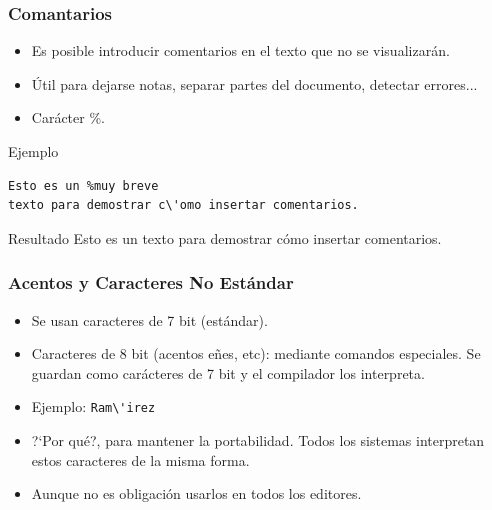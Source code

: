 \documentclass[aspectratio=43]{beamer}%
\begin{document}
\begin{frame}[fragile]
\frametitle{\textbf{Comantarios}}
\justifying
 \begin{itemize}\justifying
  \item Es posible introducir comentarios en el texto que no se visualizarán.
  \item Útil para dejarse notas, separar partes del documento, detectar errores...
  \item Carácter \%.
\end{itemize}

\begin{exampleblock}{Ejemplo}
   \vspace{-0.7cm}
\begin{lstlisting}
Esto es un %muy breve
texto para demostrar c\'omo insertar comentarios.
\end{lstlisting}\vspace{-0.3cm}

\end{exampleblock}

\begin{exampleblock}{Resultado}
Esto es un %
texto para demostrar c\'omo insertar comentarios.
\end{exampleblock}


\end{frame}

\begin{frame}[fragile]
\frametitle{\textbf{Acentos y Caracteres No Estándar}}
\justifying
 \begin{itemize}\justifying
  \item Se usan caracteres de 7 bit (estándar).
  \item Caracteres de 8 bit (acentos eñes, etc): mediante comandos especiales. Se guardan como carácteres de 7 bit y el compilador los interpreta.
  \item Ejemplo: \verb+Ram\'irez+
  \item ?`Por qué?, para mantener la portabilidad. Todos los sistemas interpretan estos caracteres de la misma forma.
  \item Aunque no es obligación usarlos en todos los editores.
\end{itemize}

\end{frame}
\end{document}
